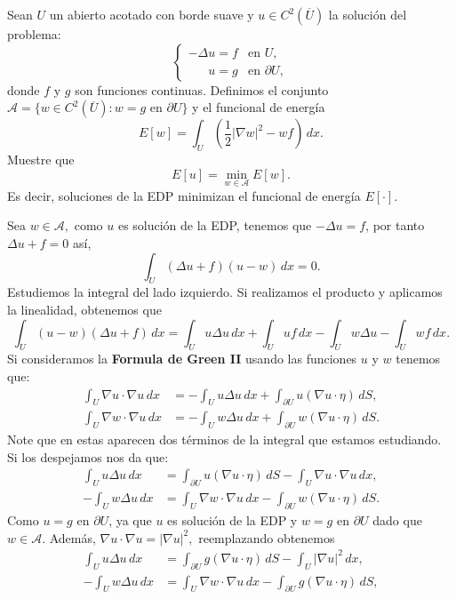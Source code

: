 \documentclass{article}
\begin{document}
\newpage
\begin{homeworkProblem}[8]
    Sean $U$ un abierto acotado con borde suave y $u\in C^2(\overline{U})$ la solución del problema:
    $$\begin{cases}
        -\Delta u=f& \text{en }U,\\
        \phantom{-\Delta}u=g & \text{en }\partial U,
    \end{cases}$$
    donde $f$ y $g$ son funciones continuas. Definimos el conjunto $\mathcal{A}=\{w\in C^2(\overline{U}):w=g\text{ en }\partial U\}$ y el funcional de energía
    $$E[w]=\int_U\left(\dfrac{1}{2}|\nabla w|^2-wf\right)\,dx.$$
    Muestre que 
    $$E[u]=\min_{w\in\mathcal{A}}E[w].$$
    Es decir, soluciones de la EDP minimizan el funcional de energía $E[\cdot].$
\end{homeworkProblem}
\begin{solucion}
    Sea $w\in\mathcal{A},$ como $u$ es solución de la EDP, tenemos que $-\Delta u=f$, por tanto $\Delta u+f=0$ así,
    $$\int_U(\Delta u+f)(u-w)\,dx=0.$$
    Estudiemos la integral del lado izquierdo. Si realizamos el producto y aplicamos la linealidad, obtenemos que
    $$\int_U(u-w)(\Delta u+f)\,dx=\int_Uu\Delta u\,dx+\int_U uf\,dx-\int_Uw\Delta u-\int_U wf\,dx.$$
    Si consideramos la \textbf{Formula de Green II} usando las funciones $u$ y $w$ tenemos que:
    \begin{align*}
      \int_U\nabla u\cdot\nabla u\,dx&=-\int_U u\Delta u\,dx+\int_{\partial U}u(\nabla u\cdot\eta)\,dS,\\
      \int_U\nabla w\cdot\nabla u\,dx&=-\int_U w\Delta u\,dx+\int_{\partial U}w(\nabla u\cdot\eta)\,dS.
    \end{align*}
    Note que en estas aparecen dos términos de la integral que estamos estudiando. Si los despejamos nos da que:
    \begin{align*}
     \int_U u\Delta u\,dx&=\int_{\partial U}u(\nabla u\cdot\eta)\,dS-\int_U\nabla u\cdot\nabla u\,dx,\\
     -\int_U w\Delta u\,dx&=\int_U\nabla w\cdot\nabla u\,dx-\int_{\partial U}w(\nabla u\cdot\eta)\,dS.
    \end{align*}
    Como $u=g$ en $\partial U$, ya que $u$ es solución de la EDP y $w=g$ en $\partial U$ dado que $w\in\mathcal{A}$. Además, $\nabla u\cdot \nabla u=|\nabla u|^2,$ reemplazando obtenemos
    \begin{align*}
      \int_U u\Delta u\,dx&=\int_{\partial U}g(\nabla u\cdot\eta)\,dS-\int_U|\nabla u|^2\,dx,\\
     -\int_U w\Delta u\,dx&=\int_U\nabla w\cdot\nabla u\,dx-\int_{\partial U}g(\nabla u\cdot\eta)\,dS,  

\end{align*}
\end{solucion}
\end{document}
